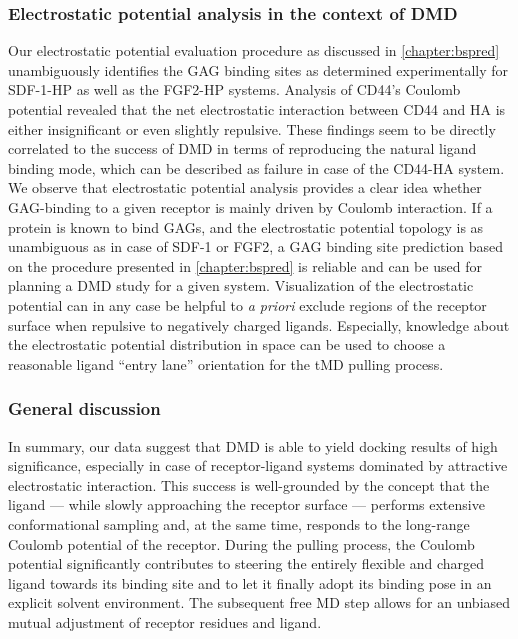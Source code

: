 \subsubsection{Electrostatic potential analysis in the context of DMD}

Our electrostatic potential evaluation procedure as discussed in
\cref{chapter:bspred} unambiguously identifies the GAG binding sites as
determined experimentally for SDF-1-HP as well as the FGF2-HP systems. Analysis
of CD44's Coulomb potential revealed that the net electrostatic interaction
between CD44 and HA is either insignificant or even slightly repulsive. These
findings seem to be directly correlated to the success of DMD in terms of
reproducing the natural ligand binding mode, which can be described as failure
in case of the CD44-HA system. We observe that electrostatic potential analysis
provides a clear idea whether GAG-binding to a given receptor is mainly driven
by Coulomb interaction. If a protein is known to bind GAGs, and the
electrostatic potential topology is as unambiguous as in case of SDF-1 or FGF2,
a GAG binding site prediction based on the procedure presented in
\cref{chapter:bspred} is reliable and can be used for planning a DMD study for a
given system. Visualization of the electrostatic potential can in any case be
helpful to \textit{a priori} exclude regions of the receptor surface when
repulsive to negatively charged ligands. Especially, knowledge about the
electrostatic potential distribution in space can be used to choose a reasonable
ligand \enquote{entry lane} orientation for the tMD pulling process.


\subsubsection{General discussion}

In summary, our data suggest that DMD is able to yield docking results of high
significance, especially in case of receptor-ligand systems dominated by
attractive electrostatic interaction. This success is well-grounded by the
concept that the ligand --- while slowly approaching the receptor surface ---
performs extensive conformational sampling and, at the same time, responds to
the long-range Coulomb potential of the receptor. During the pulling process,
the Coulomb potential significantly contributes to steering the entirely
flexible and charged ligand towards its binding site and to let it finally adopt
its binding pose in an explicit solvent environment. The subsequent free MD step
allows for an unbiased mutual adjustment of receptor residues and ligand.

